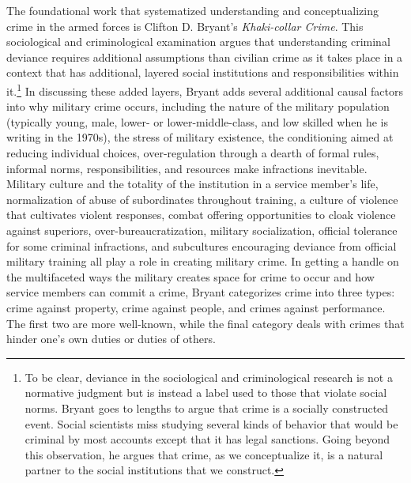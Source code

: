 The foundational work that systematized understanding and conceptualizing crime in the armed forces is Clifton D. Bryant's \textit{Khaki-collar Crime}.\cite{Bryant1979} This sociological and criminological examination argues that understanding criminal deviance requires additional assumptions than civilian crime as it takes place in a context that has additional, layered social institutions and responsibilities within it.\footnote{To be clear, deviance in the sociological and criminological research is not a normative judgment but is instead a label used to those that violate social norms. Bryant goes to lengths to argue that crime is a socially constructed event. Social scientists miss studying several kinds of behavior that would be criminal by most accounts except that it has legal sanctions. Going beyond this observation, he argues that crime, as we conceptualize it, is a natural partner to the social institutions that we construct.} In discussing these added layers, Bryant adds several additional causal factors into why military crime occurs, including the nature of the military population (typically young, male, lower- or lower-middle-class, and low skilled when he is writing in the 1970s), the stress of military existence, the conditioning aimed at reducing individual choices, over-regulation through a dearth of formal rules, informal norms, responsibilities, and resources make infractions inevitable. Military culture and the totality of the institution in a service member's life, normalization of abuse of subordinates throughout training, a culture of violence that cultivates violent responses, combat offering opportunities to cloak violence against superiors, over-bureaucratization, military socialization, official tolerance for some criminal infractions, and subcultures encouraging deviance from official military training all play a role in creating military crime. In getting a handle on the multifaceted ways the military creates space for crime to occur and how service members can commit a crime, Bryant categorizes crime into three types: crime against property, crime against people, and crimes against performance. The first two are more well-known, while the final category deals with crimes that hinder one's own duties or duties of others.

